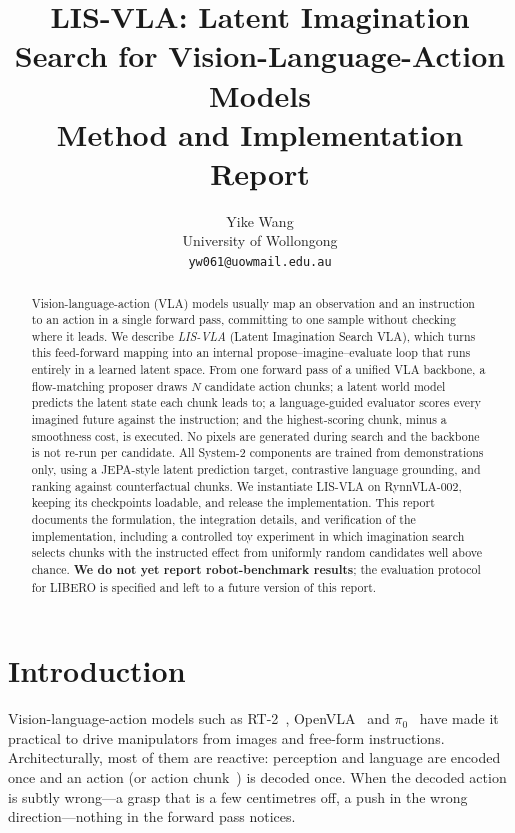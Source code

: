 \documentclass[11pt]{article}
\title{\textbf{LIS-VLA: Latent Imagination Search for Vision-Language-Action Models}\\[4pt]
\large Method and Implementation Report}
\author{Yike Wang\\
University of Wollongong\\
\texttt{yw061@uowmail.edu.au}}
\date{}
\begin{document}
\maketitle

\begin{abstract}
Vision-language-action (VLA) models usually map an observation and an instruction to an action in a single forward pass, committing to one sample without checking where it leads. We describe \emph{LIS-VLA} (Latent Imagination Search VLA), which turns this feed-forward mapping into an internal propose--imagine--evaluate loop that runs entirely in a learned latent space. From one forward pass of a unified VLA backbone, a flow-matching proposer draws $N$ candidate action chunks; a latent world model predicts the latent state each chunk leads to; a language-guided evaluator scores every imagined future against the instruction; and the highest-scoring chunk, minus a smoothness cost, is executed. No pixels are generated during search and the backbone is not re-run per candidate. All System-2 components are trained from demonstrations only, using a JEPA-style latent prediction target, contrastive language grounding, and ranking against counterfactual chunks. We instantiate LIS-VLA on RynnVLA-002, keeping its checkpoints loadable, and release the implementation. This report documents the formulation, the integration details, and verification of the implementation, including a controlled toy experiment in which imagination search selects chunks with the instructed effect from uniformly random candidates well above chance. \textbf{We do not yet report robot-benchmark results}; the evaluation protocol for LIBERO is specified and left to a future version of this report.
\end{abstract}

\section{Introduction}
\label{sec:intro}

Vision-language-action models such as RT-2~\citep{brohan2023rt2}, OpenVLA~\citep{kim2024openvla} and $\pi_0$~\citep{black2024pi0} have made it practical to drive manipulators from images and free-form instructions. Architecturally, most of them are reactive: perception and language are encoded once and an action (or action chunk~\citep{zhao2023act}) is decoded once. When the decoded action is subtly wrong---a grasp that is a few centimetres off, a push in the wrong direction---nothing in the forward pass notices.
\end{document}
